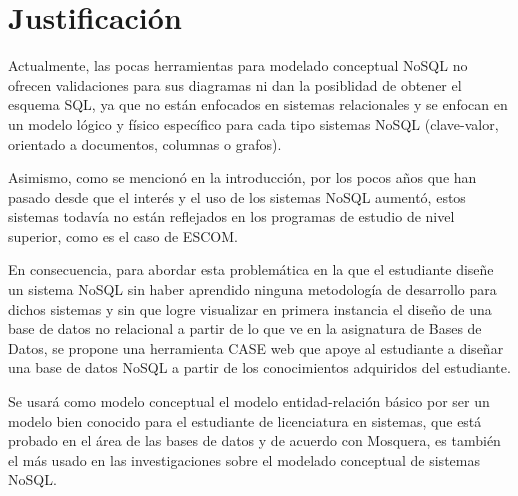 \section{Justificación}

Actualmente, las pocas herramientas para modelado conceptual NoSQL no ofrecen validaciones para sus diagramas ni dan la posiblidad de obtener el esquema SQL, ya que no están enfocados en sistemas relacionales y se enfocan en un modelo lógico y físico específico para cada tipo sistemas NoSQL (clave-valor, orientado a documentos, columnas o grafos).


Asimismo, como se mencionó en la introducción, por los pocos años que han pasado desde que el interés y el uso de los sistemas NoSQL aumentó, estos sistemas todavía no están reflejados en los programas de estudio de nivel superior, como es el caso de ESCOM.


En consecuencia, para abordar esta problemática en la que el estudiante diseñe un sistema NoSQL sin haber aprendido ninguna metodología de desarrollo para dichos sistemas y sin que logre visualizar en primera instancia el diseño de una base de datos no relacional a partir de lo que ve en la asignatura de Bases de Datos, se propone una herramienta CASE web que apoye al estudiante a diseñar una base de datos NoSQL a partir de los conocimientos adquiridos del estudiante.


Se usará como modelo conceptual el modelo entidad-relación básico por ser un modelo bien conocido para el estudiante de licenciatura en sistemas, que está probado en el área de las bases de datos y de acuerdo con Mosquera\cite{martinez-mosquera_modeling_2020}, es también el más usado en las investigaciones sobre el modelado conceptual de sistemas NoSQL.

